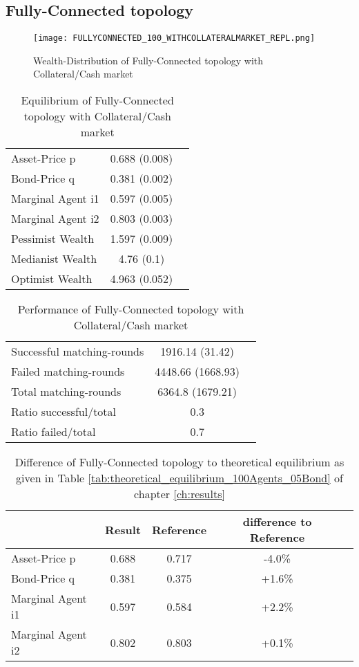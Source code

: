 \documentclass[Bachelorarbeit.tex]{subfiles}
\begin{document}
\subsection{Fully-Connected topology}

\begin{figure}[H]
	\centering
  \texttt{[image: FULLYCONNECTED\_100\_WITHCOLLATERALMARKET\_REPL.png]}
	\caption{Wealth-Distribution of Fully-Connected topology with Collateral/Cash market}
	\label{fig:wealth_FULLYCONNECTED_100_WITHCOLLATERALMARKET_REPL}
\end{figure}

\begin{table}[H]
	\caption{Equilibrium of Fully-Connected topology with Collateral/Cash market}
	\centering
	\begin{tabular} { l c r }
		\hline
		Asset-Price p & 0.688 (0.008) \\
		Bond-Price q & 0.381 (0.002) \\
		Marginal Agent i1 & 0.597 (0.005) \\
		Marginal Agent i2 & 0.803 (0.003) \\
		\hline
		Pessimist Wealth & 1.597 (0.009) \\
		Medianist Wealth & 4.76 (0.1) \\
		Optimist Wealth & 4.963 (0.052) \\
		\hline
	\end{tabular}
\end{table} 

\begin{table}[H]
	\caption{Performance of Fully-Connected topology with Collateral/Cash market}
	\centering
	\begin{tabular} { l c r }
		\hline
		Successful matching-rounds & 1916.14 (31.42) \\
		Failed matching-rounds & 4448.66 (1668.93) \\
		Total matching-rounds & 6364.8 (1679.21) \\
		\hline
		Ratio successful/total & 0.3 \\
		Ratio failed/total & 0.7 \\
		\hline
	\end{tabular}
\end{table}

\begin{table}[H]
	\caption{Difference of Fully-Connected topology to theoretical equilibrium as given in Table \ref{tab:theoretical_equilibrium_100Agents_05Bond} of chapter \ref{ch:results}}
	\centering
	\begin{tabular} { l c c c r }
		& Result & Reference & difference to Reference \\
		\hline
		Asset-Price p & 0.688 & 0.717 & -4.0\% \\
		Bond-Price q & 0.381 & 0.375 & +1.6\% \\
		Marginal Agent i1 & 0.597 & 0.584 & +2.2\% \\
		Marginal Agent i2 & 0.802 & 0.803 & +0.1\% \\
		\hline
	\end{tabular}
\end{table} 
\end{document}
